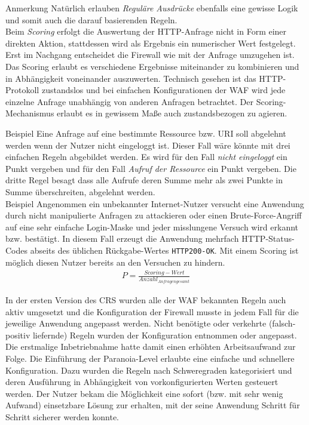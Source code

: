 \textcolor{bhtGray}{ Anmerkung} Natürlich erlauben \emph{Reguläre Ausdrücke} ebenfalls eine gewisse Logik und somit auch die darauf basierenden Regeln.\\

Beim \emph{Scoring} erfolgt die Auswertung der HTTP-Anfrage nicht in Form einer direkten Aktion, stattdessen wird als Ergebnis ein numerischer Wert festgelegt. Erst im Nachgang entscheidet die Firewall wie mit der Anfrage umzugehen ist. Das Scoring erlaubt es verschiedene Ergebnisse miteinander zu kombinieren und in Abhängigkeit voneinander auszuwerten. Technisch gesehen ist das HTTP-Protokoll zustandslos und bei einfachen Konfigurationen der WAF  wird jede einzelne Anfrage unabhängig von anderen Anfragen betrachtet. Der Scoring-Mechanismus erlaubt es in gewissem Maße auch zustandsbezogen zu agieren. 


\textcolor{bhtGray}{ Beispiel} Eine Anfrage auf eine bestimmte Ressource bzw. URI soll abgelehnt werden wenn der Nutzer nicht eingeloggt ist. Dieser Fall wäre könnte mit drei einfachen Regeln abgebildet werden. Es wird für den Fall \emph{nicht eingeloggt} ein Punkt vergeben und für den Fall \emph{Aufruf der Ressource} ein Punkt vergeben. Die dritte Regel besagt dass alle Aufrufe deren Summe mehr als zwei Punkte in Summe überschreiten, abgelehnt werden.\\

\textcolor{bhtGray}{ Beispiel} Angenommen ein unbekannter Internet-Nutzer versucht eine Anwendung durch nicht manipulierte Anfragen zu attackieren oder einen Brute-Force-Angriff auf eine sehr einfache Login-Maske und jeder misslungene Versuch wird erkannt bzw. bestätigt. In diesem Fall erzeugt die Anwendung mehrfach HTTP-Status-Codes abseits des üblichen Rückgabe-Wertes \verb=HTTP200-OK=. Mit einem Scoring ist möglich diesen Nutzer bereits an den Versuchen zu hindern.
\begin{align}
  P = \frac{Scoring-Wert}{Anzahl_{Anfragen gesamt}}
\end{align}

In der ersten Version des CRS wurden alle der WAF bekannten Regeln auch aktiv umgesetzt und die Konfiguration der Firewall musste in jedem Fall für die jeweilige Anwendung angepasst werden. Nicht benötigte oder verkehrte (falsch-positiv liefernde) Regeln wurden der Konfiguration entnommen oder angepasst. Die erstmalige Inbetriebnahme hatte damit einen erhöhten Arbeitsaufwand zur Folge. Die Einführung der Paranoia-Level erlaubte eine einfache und schnellere Konfiguration. Dazu wurden die Regeln nach Schweregraden kategorisiert und deren Ausführung in Abhängigkeit von vorkonfigurierten Werten gesteuert werden. Der Nutzer bekam die Möglichkeit eine sofort (bzw. mit sehr wenig Aufwand) einsetzbare Lösung zur erhalten, mit der seine Anwendung Schritt für Schritt sicherer werden konnte.

